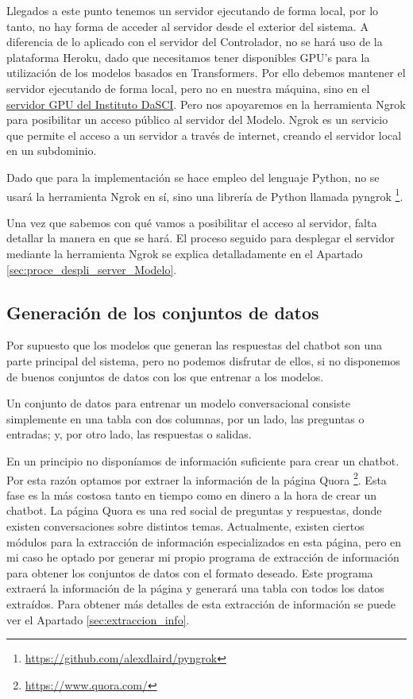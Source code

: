 Llegados a este punto tenemos un servidor ejecutando de forma local, por lo tanto, no hay forma de acceder al servidor desde el exterior del sistema. A diferencia de lo aplicado con el servidor del Controlador, no se hará uso de la plataforma Heroku, dado que necesitamos tener disponibles GPU's para la utilización de los modelos basados en Transformers. Por ello debemos mantener el servidor ejecutando de forma local, pero no en nuestra máquina, sino en el \href{https://dasci.es/es/sobre-dasci/recursos/recursos-tecnologicos/}{servidor GPU del Instituto DaSCI}. Pero nos apoyaremos en la herramienta Ngrok para posibilitar un acceso público al servidor del Modelo. Ngrok es un servicio que permite el acceso a un servidor a través de internet, creando el servidor local en un subdominio.

Dado que para la implementación se hace empleo del lenguaje Python, no se usará la herramienta Ngrok en sí, sino una librería de Python llamada pyngrok \footnote{\url{https://github.com/alexdlaird/pyngrok}}.

Una vez que sabemos con qué vamos a posibilitar el acceso al servidor, falta detallar la manera en que se hará. El proceso seguido para desplegar el servidor mediante la herramienta Ngrok se explica detalladamente en el Apartado \ref{sec:proce_despli_server_Modelo}.

\subsection{Generación de los conjuntos de datos} \label{subsec:gen_conj_datos}

Por supuesto que los modelos que generan las respuestas del chatbot son una parte principal del sistema, pero no podemos disfrutar de ellos, si no disponemos de buenos conjuntos de datos con los que entrenar a los modelos.

Un conjunto de datos para entrenar un modelo conversacional consiste simplemente en una tabla con dos columnas, por un lado, las preguntas o entradas; y, por otro lado, las respuestas o salidas.

En un principio no disponíamos de información suficiente para crear un chatbot. Por esta razón optamos por extraer la información de la página Quora \footnote{\url{https://www.quora.com/}}. Esta fase es la más costosa tanto en tiempo como en dinero a la hora de crear un chatbot. La página Quora es una red social de preguntas y respuestas, donde existen conversaciones sobre distintos temas. Actualmente, existen ciertos módulos para la extracción de información especializados en esta página, pero en mi caso he optado por generar mi propio programa de extracción de información para obtener los conjuntos de datos con el formato deseado. Este programa extraerá la información de la página y generará una tabla con todos los datos extraídos. Para obtener más detalles de esta extracción de información se puede ver el Apartado \ref{sec:extraccion_info}.

